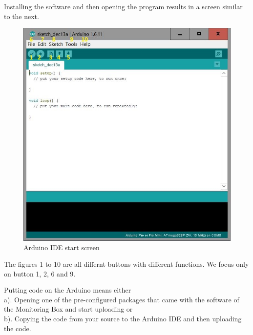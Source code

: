 \documentclass{report}
\begin{document}
Installing the software and then opening the program results in a screen similar to the next. 

\begin{figure}[H]
	\centering
\includegraphics[width=1\textwidth]{images/ArduinoIDE.JPG} 
	\caption{Arduino IDE start screen}
\end{figure}

The figures 1 to 10 are all differnt buttons with different functions. We focus only on button 1, 2,  6 and 9.

Putting code on the Arduino means either \\
a). Opening one of the pre-configured packages that came with the software of the Monitoring Box and start uploading or \\
b). Copying the code from your source to the Arduino IDE and then uploading the code. \newpage
\end{document}
